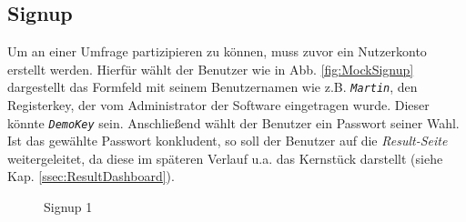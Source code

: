 \subsection{Signup}
\label{ssec:Signup}
Um an einer Umfrage partizipieren zu können, muss zuvor ein Nutzerkonto erstellt werden. 
Hierfür wählt der Benutzer wie in Abb. \vref{fig:MockSignup} dargestellt das Formfeld mit seinem Benutzernamen wie z.B. \emph{\texttt{Martin}}, den Registerkey, der vom Administrator der Software eingetragen wurde. Dieser könnte \emph{\texttt{DemoKey}} sein.
Anschließend wählt der Benutzer ein Passwort seiner Wahl. 
Ist das gewählte Passwort konkludent, so soll der Benutzer auf die \emph{Result-Seite} weitergeleitet, da diese im späteren Verlauf u.a. das Kernstück darstellt (siehe Kap. \vref{ssec:ResultDashboard}). 

\begin{figure}
	\caption[Signup 1]{Signup 1 \\ \quelle}
	\label{fig:MockSignup}
\end{figure}